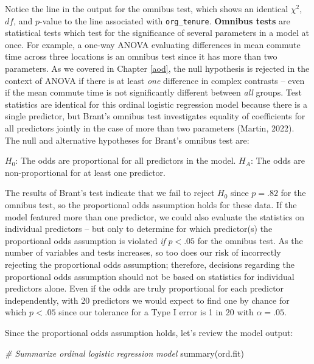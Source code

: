 \documentclass[
]{book}
\newenvironment{Shaded}{\begin{snugshade}}{\end{snugshade}}
\newcommand{\CommentTok}[1]{\textcolor[rgb]{0.56,0.35,0.01}{\textit{#1}}}
\newcommand{\FunctionTok}[1]{\textcolor[rgb]{0.00,0.00,0.00}{#1}}
\newcommand{\NormalTok}[1]{#1}
\begin{document}
Notice the line in the output for the omnibus test, which shows an identical \(\chi^2\), \(df\), and \(p\)-value to the line associated with \texttt{org\_tenure}. \textbf{Omnibus tests} are statistical tests which test for the significance of several parameters in a model at once. For example, a one-way ANOVA evaluating differences in mean commute time across three locations is an omnibus test since it has more than two parameters. As we covered in Chapter \ref{aod}, the null hypothesis is rejected in the context of ANOVA if there is at least \emph{one} difference in complex contrasts -- even if the mean commute time is not significantly different between \emph{all} groups. Test statistics are identical for this ordinal logistic regression model because there is a single predictor, but Brant's omnibus test investigates equality of coefficients for all predictors jointly in the case of more than two parameters (Martin, 2022). The null and alternative hypotheses for Brant's omnibus test are:

\(H_0\): The odds are proportional for all predictors in the model.
\(H_A\): The odds are non-proportional for at least one predictor.

The results of Brant's test indicate that we fail to reject \(H_0\) since \(p = .82\) for the omnibus test, so the proportional odds assumption holds for these data. If the model featured more than one predictor, we could also evaluate the statistics on individual predictors -- but only to determine for which predictor(s) the proportional odds assumption is violated \emph{if} \(p < .05\) for the omnibus test. As the number of variables and tests increases, so too does our risk of incorrectly rejecting the proportional odds assumption; therefore, decisions regarding the proportional odds assumption should not be based on statistics for individual predictors alone. Even if the odds are truly proportional for each predictor independently, with 20 predictors we would expect to find one by chance for which \(p < .05\) since our tolerance for a Type I error is 1 in 20 with \(\alpha = .05\).

Since the proportional odds assumption holds, let's review the model output:

\begin{Shaded}
\begin{Highlighting}[]
\CommentTok{\# Summarize ordinal logistic regression model}
\FunctionTok{summary}\NormalTok{(ord.fit)}
\end{Highlighting}
\end{Shaded}
\end{document}
